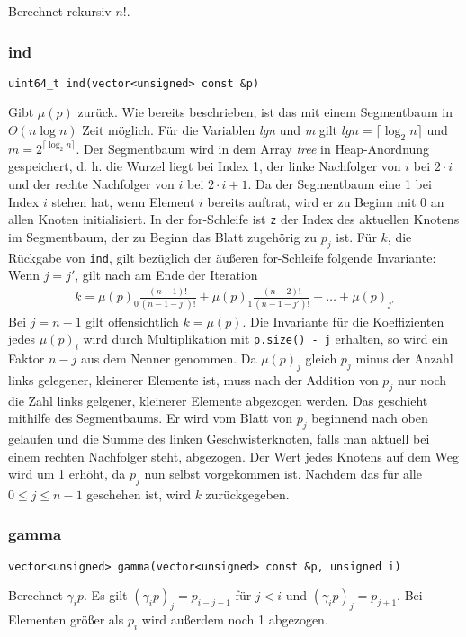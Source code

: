 \documentclass[a4paper, 10pt, ngerman]{article}
\begin{document}
\noindent Berechnet rekursiv $n!$.

\subsubsection{ind}
\verb|uint64_t ind(vector<unsigned> const &p)|
\medskip

\noindent Gibt $\mu(p)$ zurück. Wie bereits beschrieben, ist das mit einem Segmentbaum in $\Theta(n \log n)$ Zeit möglich. Für die Variablen \emph{lgn} und \emph{m} gilt $lgn = \lceil \log_2 n \rceil$ und $m = 2^{\lceil \log_2 n \rceil}$. Der Segmentbaum wird in dem Array \emph{tree} in Heap-Anordnung gespeichert, d. h. die Wurzel liegt bei Index 1, der linke Nachfolger von $i$ bei $2 \cdot i$ und der rechte Nachfolger von $i$ bei $2 \cdot i + 1$. Da der Segmentbaum eine 1 bei Index $i$ stehen hat, wenn Element $i$ bereits auftrat, wird er zu Beginn mit 0 an allen Knoten initialisiert. In der for-Schleife ist \verb|z| der Index des aktuellen Knotens im Segmentbaum, der zu Beginn das Blatt zugehörig zu $p_j$ ist. Für $k$, die Rückgabe von \verb|ind|, gilt bezüglich der äußeren for-Schleife folgende Invariante: Wenn $j = j'$, gilt nach am Ende der Iteration
\begin{align*}
    k = \mu(p)_0 \frac {(n - 1)!} {(n - 1 - j')!} + \mu(p)_1 \frac {(n - 2)!} {(n - 1 - j')!} + \dots + \mu(p)_{j'}
\end{align*}
Bei $j = n - 1$ gilt offensichtlich $k = \mu(p)$. Die Invariante für die Koeffizienten jedes $\mu(p)_i$ wird durch Multiplikation mit \verb|p.size() - j| erhalten, so wird ein Faktor $n - j$ aus dem Nenner genommen. Da $\mu(p)_j$ gleich $p_j$ minus der Anzahl links gelegener, kleinerer Elemente ist, muss nach der Addition von $p_j$ nur noch die Zahl links gelgener, kleinerer Elemente abgezogen werden. Das geschieht mithilfe des Segmentbaums. Er wird vom Blatt von $p_j$ beginnend nach oben gelaufen und die Summe des linken Geschwisterknoten, falls man aktuell bei einem rechten Nachfolger steht, abgezogen. Der Wert jedes Knotens auf dem Weg wird um 1 erhöht, da $p_j$ nun selbst vorgekommen ist. Nachdem das für alle $0 \le j \le n - 1$ geschehen ist, wird $k$ zurückgegeben.

\subsubsection{gamma}
\verb|vector<unsigned> gamma(vector<unsigned> const &p, unsigned i)|
\medskip

\noindent Berechnet $\gamma_i p$. Es gilt $(\gamma_i p)_j = p_{i - j - 1}$ für $j < i$ und $(\gamma_i p)_j = p_{j + 1}$. Bei Elementen größer als $p_i$ wird außerdem noch 1 abgezogen.
\end{document}
